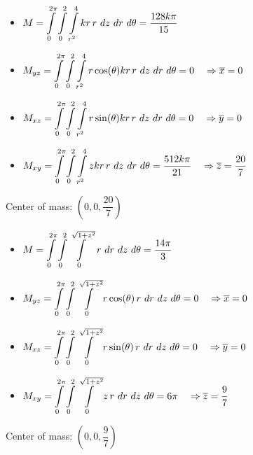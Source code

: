 \begin{Answer}
        \Question  \begin{itemize}
            \item $M = \ds\int\limits_0^{2\pi}\int\limits_0^2\int\limits_{r^2}^4 kr \, r\ dz\ dr\ d\theta   = \dfrac{128k\pi}{15}$
            \item $M_{yz} = \displaystyle\int\limits_0^{2\pi}\int\limits_0^2\int\limits_{r^2}^4 r \cos(\theta) kr \, r\ dz\ dr\ d\theta   = 0 \quad \Rightarrow \overline{x} = 0$ 
            \item $M_{xz} = \displaystyle\int\limits_0^{2\pi}\int\limits_0^2\int\limits_{r^2}^4 r \sin(\theta) kr \, r\ dz\ dr\ d\theta   = 0 \quad \Rightarrow \overline{y} = 0$ 
            \item $M_{xy} = \ds\int\limits_0^{2\pi}\int\limits_0^2\int\limits_{r^2}^4 z kr \, r\ dz\ dr\ d\theta   = \dfrac{512k\pi}{21} \quad \Rightarrow \overline{z} = \dfrac{20}{7}$ 
            \end{itemize}
            Center of mass: $\left(0,0,\dfrac{20}{7}\right)$
        
        \Question 
        \begin{itemize}
            \item $M = \displaystyle\int\limits_0^{2\pi}\int\limits_0^2\int\limits_{0}^{\sqrt{1+z^2}}\, r\ dr\ dz\ d\theta   = \dfrac{14\pi}{3}$
            \item $M_{yz} = \displaystyle\int\limits_0^{2\pi}\int\limits_0^2\int\limits_{0}^{\sqrt{1+z^2}} r \cos(\theta)\, r\ dr\ dz\ d\theta    = 0 \quad \Rightarrow \overline{x} = 0$ 
            \item $M_{xz} = \displaystyle\int\limits_0^{2\pi}\int\limits_0^2\int\limits_{0}^{\sqrt{1+z^2}} r \sin(\theta)\, r\ dr\ dz\ d\theta  = 0 \quad \Rightarrow \overline{y} = 0$ 
            \item $M_{xy} = \displaystyle\int\limits_0^{2\pi}\int\limits_0^2\int\limits_{0}^{\sqrt{1+z^2}} z \, r\ dr\ dz\ d\theta   = 6 \pi \quad \Rightarrow \overline{z} = \dfrac{9}{7}$ 
            \end{itemize}
            Center of mass: $\left(0,0,\dfrac{9}{7}\right)$
        
    
\end{Answer}